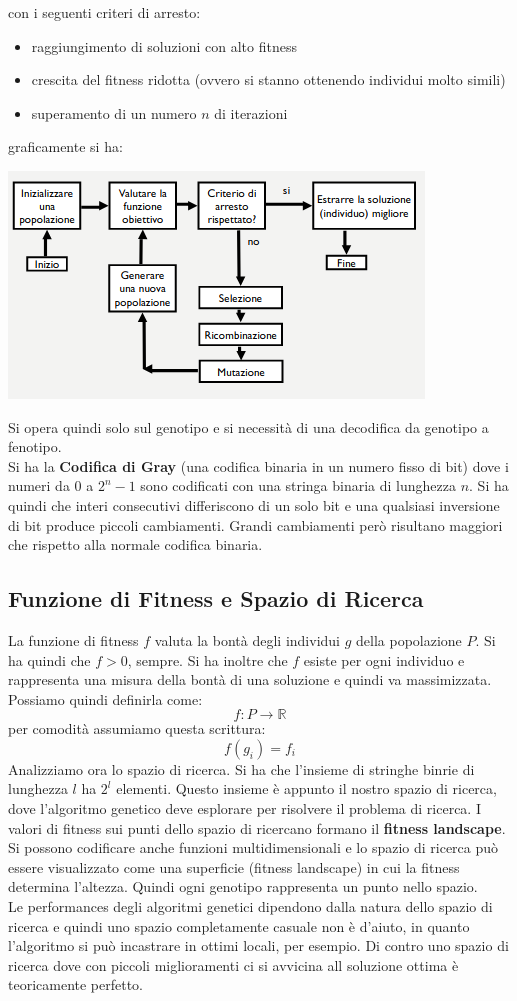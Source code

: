 \message{ !name(ro.tex)}\documentclass[a4paper,12pt, oneside]{book}
\begin{document}
con i seguenti criteri di arresto:
\begin{itemize}
  \item raggiungimento di soluzioni con alto fitness
  \item crescita del fitness ridotta (ovvero si stanno ottenendo
  individui molto simili)
  \item superamento di un numero $n$ di iterazioni
\end{itemize}
graficamente si ha:
\begin{center}
  \includegraphics[scale = 0.7]{img/bio2.png}
\end{center}
Si opera quindi solo sul genotipo e si necessità di una decodifica da
genotipo a fenotipo. \\
Si ha la \textbf{Codifica di Gray} (una codifica binaria in un
numero fisso di bit) dove i numeri da 0 a $2^n-1$ sono
codificati con una stringa binaria di lunghezza $n$. Si ha quindi che
interi consecutivi differiscono di un solo bit e una qualsiasi
inversione di bit produce piccoli cambiamenti. Grandi cambiamenti però
risultano maggiori che rispetto alla normale codifica binaria.\\
\subsection{Funzione di Fitness e Spazio di Ricerca}
La funzione di fitness $f$ valuta la bontà degli individui $g$ della
popolazione $P$. Si ha quindi che $f>0$, sempre. Si ha inoltre che
$f$ esiste per ogni individuo e rappresenta una misura della bontà di
una soluzione e quindi va massimizzata. Possiamo quindi definirla
come: 
\[f:P\to\mathbb{R}\]
per comodità assumiamo questa scrittura:
\[f(g_i)=f_i\]
Analizziamo ora lo spazio di ricerca. Si ha che l'insieme di stringhe
binrie di lunghezza $l$ ha $2^l$ elementi. Questo insieme è appunto il
nostro spazio di ricerca, dove l'algoritmo genetico deve esplorare per
risolvere il problema di ricerca. I valori di fitness sui punti dello
spazio di ricercano formano il \textbf{fitness landscape}.\\
Si possono codificare anche funzioni multidimensionali e lo spazio di
ricerca può essere visualizzato come una superficie (fitness
landscape) in cui la fitness determina l’altezza. Quindi ogni genotipo
rappresenta un punto nello spazio. \\
Le performances degli algoritmi genetici dipendono dalla natura dello
spazio di ricerca e quindi uno spazio completamente casuale non è
d'aiuto, in quanto l'algoritmo si può incastrare in ottimi locali, per
esempio. Di contro uno spazio di ricerca dove con piccoli
miglioramenti ci si avvicina all soluzione ottima è teoricamente
perfetto.
\end{document}
